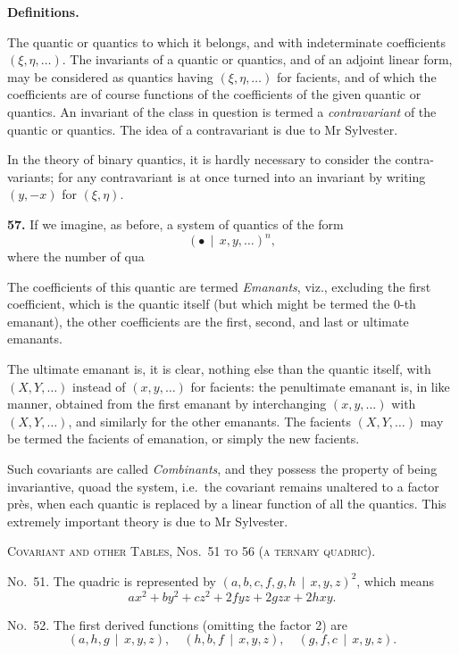 \documentclass[11pt,a4paper]{article}
\begin{document}
\clearpage
\noindent\textbf{Definitions.}

The quantic or quantics to which it belongs, and with indeterminate coefficients
$(\xi, \eta, \ldots)$. The invariants of a quantic or quantics, and of an adjoint linear form, may
be considered as quantics having $(\xi, \eta, \ldots)$ for facients, and of which the coefficients
are of course functions of the coefficients of the given quantic or quantics.
An invariant of the class in question is termed a \textit{contravariant} of the quantic
or quantics. The idea of a contravariant is due to Mr Sylvester.

In the theory of binary quantics, it is hardly necessary to consider the contra-
variants; for any contravariant is at once turned into an invariant by writing
$(y, -x)$ for $(\xi, \eta)$.

\textbf{57.} If we imagine, as before, a system of quantics of the form
\[(\bullet\, \mid\, x, y, \ldots)^n,\]
where the number of qua

\bigskip
The coefficients of this quantic are termed \textit{Emanants}, viz., excluding the first
coefficient, which is the quantic itself (but which might be termed the 0-th emanant),
the other coefficients are the first, second, and last or ultimate emanants.

The ultimate emanant is, it is clear, nothing else than the quantic itself,
with $(X, Y, \ldots)$ instead of $(x, y, \ldots)$ for facients: the penultimate emanant is, in like
manner, obtained from the first emanant by interchanging $(x, y, \ldots)$ with $(X, Y, \ldots)$,
and similarly for the other emanants. The facients $(X, Y, \ldots)$ may be termed
the facients of emanation, or simply the new facients.

Such covariants are called \textit{Combinants}, and they possess the property of being
invariantive, quoad the system, i.e.\ the covariant remains unaltered to a factor pr\`es,
when each quantic is replaced by a linear function of all the quantics.
This extremely important theory is due to Mr Sylvester.

\clearpage
\noindent\textsc{Covariant and other Tables, Nos.~51 to 56 (a ternary quadric).}

\noindent\textsc{No.~51.} The quadric is represented by $(a, b, c, f, g, h \, \mid\, x, y, z)^2$,
which means
\[ax^2 + by^2 + cz^2 + 2fyz + 2gzx + 2hxy.\]

\noindent\textsc{No.~52.} The first derived functions (omitting the factor 2) are
\[(a, h, g \, \mid\, x, y, z),\quad (h, b, f \, \mid\, x, y, z),\quad (g, f, c \, \mid\, x, y, z).\]
\end{document}
